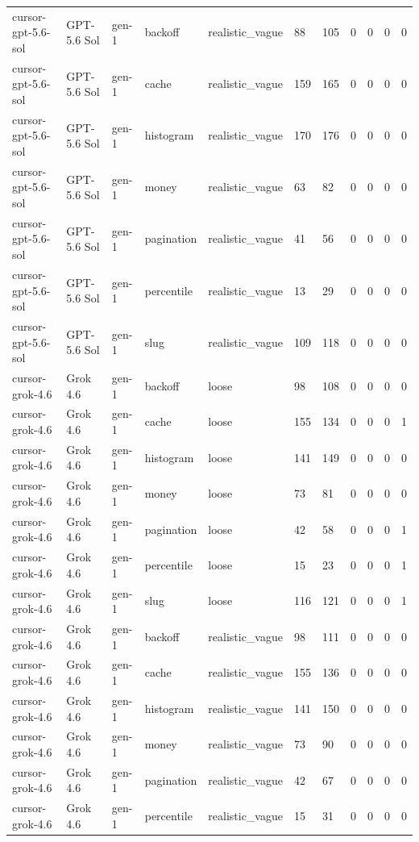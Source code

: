 \begin{tabular}{lllllllllll}
cursor-gpt-5.6-sol & GPT-5.6 Sol & gen-1 & backoff & realistic\_vague & 88 & 105 & 0 & 0 & 0 & 0 \\
cursor-gpt-5.6-sol & GPT-5.6 Sol & gen-1 & cache & realistic\_vague & 159 & 165 & 0 & 0 & 0 & 0 \\
cursor-gpt-5.6-sol & GPT-5.6 Sol & gen-1 & histogram & realistic\_vague & 170 & 176 & 0 & 0 & 0 & 0 \\
cursor-gpt-5.6-sol & GPT-5.6 Sol & gen-1 & money & realistic\_vague & 63 & 82 & 0 & 0 & 0 & 0 \\
cursor-gpt-5.6-sol & GPT-5.6 Sol & gen-1 & pagination & realistic\_vague & 41 & 56 & 0 & 0 & 0 & 0 \\
cursor-gpt-5.6-sol & GPT-5.6 Sol & gen-1 & percentile & realistic\_vague & 13 & 29 & 0 & 0 & 0 & 0 \\
cursor-gpt-5.6-sol & GPT-5.6 Sol & gen-1 & slug & realistic\_vague & 109 & 118 & 0 & 0 & 0 & 0 \\
cursor-grok-4.6 & Grok 4.6 & gen-1 & backoff & loose & 98 & 108 & 0 & 0 & 0 & 0 \\
cursor-grok-4.6 & Grok 4.6 & gen-1 & cache & loose & 155 & 134 & 0 & 0 & 0 & 1 \\
cursor-grok-4.6 & Grok 4.6 & gen-1 & histogram & loose & 141 & 149 & 0 & 0 & 0 & 0 \\
cursor-grok-4.6 & Grok 4.6 & gen-1 & money & loose & 73 & 81 & 0 & 0 & 0 & 0 \\
cursor-grok-4.6 & Grok 4.6 & gen-1 & pagination & loose & 42 & 58 & 0 & 0 & 0 & 1 \\
cursor-grok-4.6 & Grok 4.6 & gen-1 & percentile & loose & 15 & 23 & 0 & 0 & 0 & 1 \\
cursor-grok-4.6 & Grok 4.6 & gen-1 & slug & loose & 116 & 121 & 0 & 0 & 0 & 1 \\
cursor-grok-4.6 & Grok 4.6 & gen-1 & backoff & realistic\_vague & 98 & 111 & 0 & 0 & 0 & 0 \\
cursor-grok-4.6 & Grok 4.6 & gen-1 & cache & realistic\_vague & 155 & 136 & 0 & 0 & 0 & 0 \\
cursor-grok-4.6 & Grok 4.6 & gen-1 & histogram & realistic\_vague & 141 & 150 & 0 & 0 & 0 & 0 \\
cursor-grok-4.6 & Grok 4.6 & gen-1 & money & realistic\_vague & 73 & 90 & 0 & 0 & 0 & 0 \\
cursor-grok-4.6 & Grok 4.6 & gen-1 & pagination & realistic\_vague & 42 & 67 & 0 & 0 & 0 & 0 \\
cursor-grok-4.6 & Grok 4.6 & gen-1 & percentile & realistic\_vague & 15 & 31 & 0 & 0 & 0 & 0 \\

\end{tabular}
